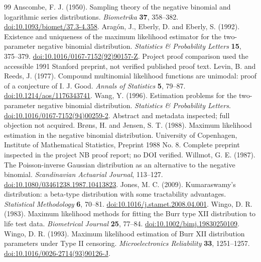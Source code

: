 \documentclass[12pt]{article}
\theoremstyle{definition}
\theoremstyle{remark}
\begin{document}
\begin{thebibliography}{99}
 Anscombe, F. J. (1950). Sampling theory of the negative binomial and logarithmic series distributions. \textit{Biometrika} \textbf{37}, 358--382. \href{https://doi.org/10.1093/biomet/37.3-4.358}{doi:10.1093/biomet/37.3-4.358}.
 Arag\'on, J., Eberly, D. and Eberly, S. (1992). Existence and uniqueness of the maximum likelihood estimator for the two-parameter negative binomial distribution. \textit{Statistics \& Probability Letters} \textbf{15}, 375--379. \href{https://doi.org/10.1016/0167-7152(92)90157-Z}{doi:10.1016/0167-7152(92)90157-Z}. Project proof comparison used the accessible 1991 Stanford preprint, not verified published proof text.
 Levin, B. and Reeds, J. (1977). Compound multinomial likelihood functions are unimodal: proof of a conjecture of I. J. Good. \textit{Annals of Statistics} \textbf{5}, 79--87. \href{https://doi.org/10.1214/aos/1176343741}{doi:10.1214/aos/1176343741}.
 Wang, Y. (1996). Estimation problems for the two-parameter negative binomial distribution. \textit{Statistics \& Probability Letters}. \href{https://doi.org/10.1016/0167-7152(94)00259-2}{doi:10.1016/0167-7152(94)00259-2}. Abstract and metadata inspected; full objection not acquired.
 Br\o ns, H. and Jensen, S. T. (1988). Maximum likelihood estimation in the negative binomial distribution. University of Copenhagen, Institute of Mathematical Statistics, Preprint 1988 No. 8. Complete preprint inspected in the project NB proof report; no DOI verified.
 Willmot, G. E. (1987). The Poisson-inverse Gaussian distribution as an alternative to the negative binomial. \textit{Scandinavian Actuarial Journal}, 113--127. \href{https://doi.org/10.1080/03461238.1987.10413823}{doi:10.1080/03461238.1987.10413823}.
 Jones, M. C. (2009). Kumaraswamy's distribution: a beta-type distribution with some tractability advantages. \textit{Statistical Methodology} \textbf{6}, 70--81. \href{https://doi.org/10.1016/j.stamet.2008.04.001}{doi:10.1016/j.stamet.2008.04.001}.
 Wingo, D. R. (1983). Maximum likelihood methods for fitting the Burr type XII distribution to life test data. \textit{Biometrical Journal} \textbf{25}, 77--84. \href{https://doi.org/10.1002/bimj.19830250109}{doi:10.1002/bimj.19830250109}.
 Wingo, D. R. (1993). Maximum likelihood estimation of Burr XII distribution parameters under Type II censoring. \textit{Microelectronics Reliability} \textbf{33}, 1251--1257. \href{https://doi.org/10.1016/0026-2714(93)90126-J}{doi:10.1016/0026-2714(93)90126-J}.

\end{thebibliography}
\end{document}
